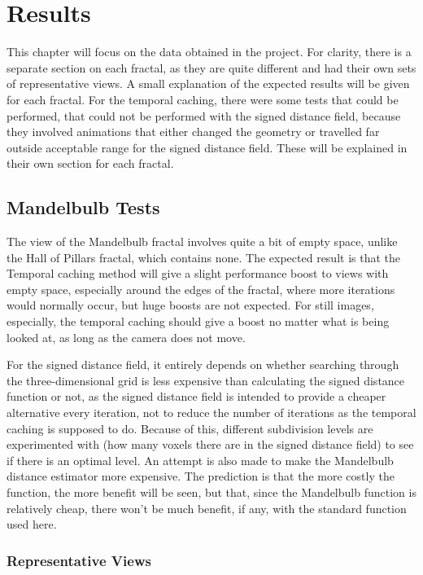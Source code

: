 \chapter{Results}
\label{chapter:results}

This chapter will focus on the data obtained in the project. For clarity, there is a separate section on each fractal, as they are quite different and had their own sets of representative views. A small explanation of the expected results will be given for each fractal. For the temporal caching, there were some tests that could be performed, that could not be performed with the signed distance field, because they involved animations that either changed the geometry or travelled far outside acceptable range for the signed distance field. These will be explained in their own section for each fractal.

\section{Mandelbulb Tests}

The view of the Mandelbulb fractal involves quite a bit of empty space, unlike the Hall of Pillars fractal, which contains none. The expected result is that the Temporal caching method will give a slight performance boost to views with empty space, especially around the edges of the fractal, where more iterations would normally occur, but huge boosts are not expected. For still images, especially, the temporal caching should give a boost no matter what is being looked at, as long as the camera does not move.\newline

For the signed distance field, it entirely depends on whether searching through the three-dimensional grid is less expensive than calculating the signed distance function or not, as the signed distance field is intended to provide a cheaper alternative every iteration, not to reduce the number of iterations as the temporal caching is supposed to do. Because of this, different subdivision levels are experimented with (how many voxels there are in the signed distance field) to see if there is an optimal level. An attempt is also made to make the Mandelbulb distance estimator more expensive. The prediction is that the more costly the function, the more benefit will be seen, but that, since the Mandelbulb function is relatively cheap, there won't be much benefit, if any, with the standard function used here.

\subsection{Representative Views}

